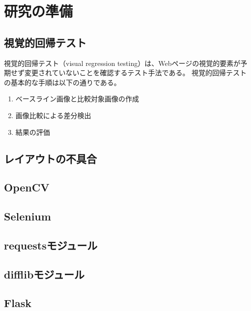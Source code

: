 \chapter{研究の準備}\label{cha:Preparation}

\section{視覚的回帰テスト}\label{sec:vrt}
視覚的回帰テスト（visual regression testing）は、Webページの視覚的要素が予期せず変更されていないことを確認するテスト手法である。
視覚的回帰テストの基本的な手順は以下の通りである。
\begin{enumerate}
    \setlength{\itemsep}{0pt}
          \setlength{\parsep}{0pt}
    \item ベースライン画像と比較対象画像の作成
    \item 画像比較による差分検出
    \item 結果の評価
\end{enumerate}
\section{レイアウトの不具合}\label{sec:layout effect}

\section{OpenCV}\label{sec:OpenCV}

\section{Selenium}\label{sec:Selenium}

\section{requestsモジュール}\label{sec:requests}

\section{difflibモジュール}\label{sec:difflib}

\section{Flask}\label{sec:Flask}